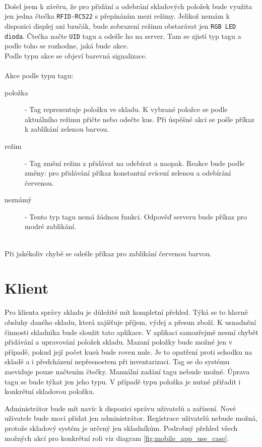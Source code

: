 \documentclass[czech,BP]{thesiskiv}
\begin{document}
				\ \\
				Došel jsem k závěru, že pro přidání a odebrání skladových položek bude využita jen jedna čtečka \texttt{RFID-RC522} s přepínáním mezi režimy.
				Jelikož nemám k dispozici displej ani bzučák, bude zobrazení režimu obstarávat jen \texttt{RGB LED dioda}. Čtečka načte \texttt{UID} tagu a odešle ho na server. Tam se zjistí typ tagu a podle toho se rozhodne, jaká bude akce.\\ Podle typu akce se objeví barevná signalizace. 
				\\\\
				Akce podle typu tagu:
				\begin{description}
					\item [položka] - Tag reprezentuje položku ve skladu. K vybrané položce se podle aktuálního režimu přičte nebo odečte kus. Při úspěšné akci se pošle příkaz k zablikání zelenou barvou.
									
					\item [režim] - Tag změní režim z přidávat na odebírat a naopak. Reakce bude podle změny: pro přidávání příkaz konstantní svícení zelenou a odebírání červenou.
					\item [neznámý] - Tento typ tagu nemá žádnou funkci. Odpověď serveru bude příkaz pro modré zablikání.
				\end{description}
				\ \\
				Při jakékoliv chybě se odešle příkaz pro zablikání červenou barvou.

				
	\section{Klient}
		Pro klienta správy skladu je důležité mít kompletní přehled. Týká se to hlavně obsluhy daného skladu, která zajišťuje příjem, výdej a přesun zboží.
		K usnadnění činnosti skladníka bude sloužit tato aplikace. V aplikaci samozřejmě nesmí chybět přidávání a upravování položek skladu.
		Mazaní položky bude možné jen v případě, pokud její počet kusů bude roven nule. Je to opatření proti schodku na skladě a i předcházení nepřesnostem při inventarizaci.
		Tag se do systému zaeviduje pouze načtením čtečky. Manuální zadání tagu nebude možné. Úprava tagu se bude týkat jen jeho typu. V případě typu položka je nutné přiřadit i konkrétní skladovou položku.
		
		Administrátor bude mít navíc k dispozici správu uživatelů a zařízení.
		Nové uživatele bude moci přidat jen administrátor. Registrace uživatelů nebude možná, protože skladový systém je určený jen skladníkům.
		Podrobný přehled všech možných akcí pro konkrétní roli viz diagram \ref{fig:mobile_app_use_case}. 
		
\end{document}
